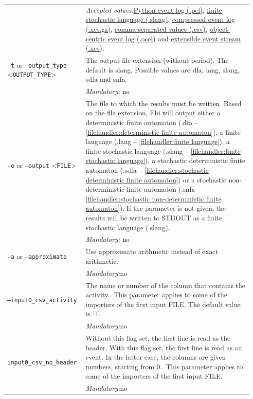 {\begin{tabularx}{\linewidth}{lX}
&\textit{Accepted values:}\quad \hyperref[filehandler:Python event log]{Python event log (.pel)}, \hyperref[filehandler:finite stochastic language]{finite stochastic language (.slang)}, \hyperref[filehandler:compressed event log]{compressed event log (.xes.gz)}, \hyperref[filehandler:comma-separated values]{comma-separated values (.csv)}, \hyperref[filehandler:object-centric event log]{object-centric event log (.ocel)} and \hyperref[filehandler:extensible event stream]{extensible event stream (.xes)}.\\
\texttt{-t} or \texttt{--output\_type} <\texttt{OUTPUT\_TYPE}> &
The output file extension (without period). The default is slang. Possible values are dfa, lang, slang, sdfa and snfa.\\
&\textit{Mandatory:} \quad no\\
\texttt{-o} or \texttt{--output} <\texttt{FILE}> &
The file to which the results must be written. Based on the file extension, Ebi will output either a deterministic finite automaton (.dfa -- \cref{filehandler:deterministic finite automaton}), a finite language (.lang -- \cref{filehandler:finite language}), a finite stochastic language (.slang -- \cref{filehandler:finite stochastic language}), a stochastic deterministic finite automaton (.sdfa -- \cref{filehandler:stochastic deterministic finite automaton}) or a stochastic non-deterministic finite automaton (.snfa -- \cref{filehandler:stochastic non-deterministic finite automaton}).
If the parameter is not given, the results will be written to STDOUT as a finite stochastic language (.slang).\\
&\textit{Mandatory:} \quad no\\
\texttt{-a} or \texttt{--approximate} & Use approximate arithmetic instead of exact arithmetic.\\
&\textit{Mandatory:}\quad no\\
\texttt{--input0\_csv\_activity} & The name or number of the column that contains the activity.. This parameter applies to some of the importers of the first input FILE. The default value is `1'.\\
&\textit{Mandatory:}\quad no\\
\texttt{--input0\_csv\_no\_header} & Without this flag set, the first line is read as the header. 
    With this flag set, the first line is read as an event. In the latter case, the columns are given numbers, starting from 0.. This parameter applies to some of the importers of the first input FILE. \\
&\textit{Mandatory:}\quad no\\

\end{tabularx}}
